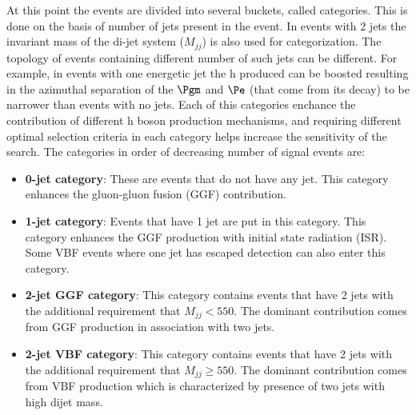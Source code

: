 At this point the events are divided into several buckets, called categories. This is done on the basis of number of jets present in the event. In events with 2 jets the invariant mass of the di-jet system ($M_{jj}$) is also used for categorization. The topology of events containing different number of such jets can be different. For example, in events with one energetic jet the h produced can be boosted resulting in the azimuthal separation of the $\Pgm$ and $\Pe$ (that come from its decay) to be narrower than events with no jets. Each of this categories enchance the contribution of different h boson production mechanisms, and requiring different optimal selection criteria in each category  helps increase the sensitivity of the search. The categories in order of decreasing number of signal events are:
\begin{itemize}%
\item \textbf{0-jet category}: These are events that do not have any jet. This category enhances the gluon-gluon fusion (GGF) contribution.
\item \textbf{1-jet category}: Events that have 1 jet are put in this category. This category enhances the GGF production with initial state radiation (ISR). Some VBF events where one jet has escaped detection can also enter this category.
\item \textbf {2-jet GGF category}: This category contains events that have 2 jets with the additional requirement that $M_{jj}<550$\GeV. The dominant contribution comes from GGF production in association with two jets.
\item \textbf{2-jet VBF category}: This category contains events that have 2 jets with the additional requirement that $M_{jj}\geq 550$\GeV. The dominant contribution comes from VBF production which is characterized by presence of two jets with high dijet mass.  
\end{itemize}

